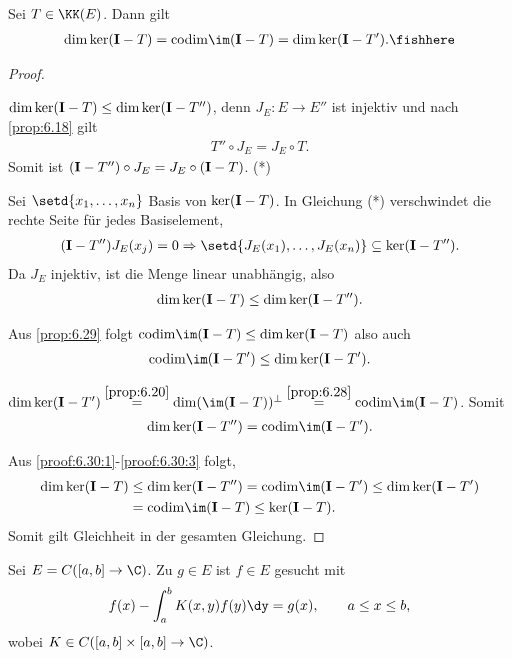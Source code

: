 \begin{prop}
\label{prop:6.30}
Sei $T\in\KK(E)$. Dann gilt
\begin{align*}
\dim \ker(\Id-T) = \codim \im(\Id-T) = \dim \ker (\Id-T').\fishhere
\end{align*}
\end{prop}
\begin{proof}
\begin{proofenum}
\item\label{proof:6.30:1} $\dim \ker(\mathbf{I}-T) \le \dim \ker(\mathbf{I}-T'')$, denn
$J_E:E\to E''$ ist injektiv und nach \ref{prop:6.18} gilt
\begin{align*}
T''\circ J_E = J_E\circ T.
\end{align*}
Somit ist $(\mathbf{I}-T'')\circ J_E = J_E\circ (\mathbf{I}-T)$. (*)

Sei $\setd{x_1,\ldots,x_n}$ Basis von $\ker(\mathbf{I}-T)$. In Gleichung (*)
verschwindet die rechte Seite für jedes Basiselement,
\begin{align*}
(\Id-T'')J_E(x_j) = 0 \Rightarrow \setd{J_E(x_1),\ldots,J_E(x_n)} \subseteq
\ker (\Id-T'').
\end{align*}
Da $J_E$ injektiv, ist die Menge linear unabhängig, also 
\begin{align*}
\dim \ker(\mathbf{I}-T)\le\dim \ker(\mathbf{I}-T'').
\end{align*}
\item\label{proof:6.30:2} Aus \ref{prop:6.29} folgt $\codim\im (\Id-T) \le
\dim\ker(\Id-T)$ also auch
\begin{align*}
\codim\im (\Id-T')\le \dim \ker(\Id-T').
\end{align*}
\item\label{proof:6.30:3} $\dim \ker(\Id-T') \overset{\ref{prop:6.20}}{=} \dim
(\im(\Id-T))^\bot \overset{\ref{prop:6.28}}{=} \codim \im (\Id-T)$. Somit
\begin{align*}
\dim \ker(\Id-T'') = \codim\im (\Id-T').
\end{align*}
\end{proofenum}
Aus \ref{proof:6.30:1}-\ref{proof:6.30:3} folgt,
\begin{align*}
\dim \ker (\Id-T) &\le \dim \ker(\Id-T'') = \codim \im (\Id-T') \le
\dim \ker(\Id-T') \\ &= \codim \im (\Id-T) \le \ker (\Id-T).
\end{align*}
Somit gilt Gleichheit in der gesamten Gleichung.\qedhere
\end{proof}

\begin{prop}
\label{prop:6.31}
Sei $E=C([a,b]\to\C)$. Zu $g\in E$ ist $f\in E$ gesucht mit
\begin{align*}
f(x) - \int_a^b K(x,y)f(y)\dy = g(x),\qquad a\le x\le b,
\end{align*}
wobei $K\in C([a,b]\times[a,b]\to \C)$.\fishhere
\end{prop}

